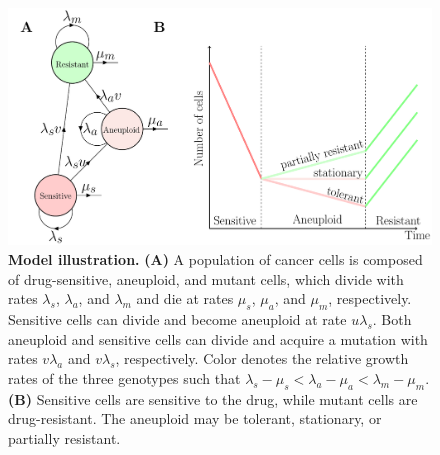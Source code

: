 \documentclass[12pt]{extarticle}
\begin{document}
\begin{figure}
\centering
\includegraphics[width=\textwidth]{Figures/figureAneuploidy.pdf}
\caption{
\textbf{Model illustration.}
\textbf{(A)} A population of cancer cells is composed of drug-sensitive, aneuploid, and mutant cells, which divide with rates $\lambda_s$, $\lambda_a$, and $\lambda_m$ and die at rates $\mu_s$, $\mu_a$, and $\mu_m$, respectively. 
Sensitive cells can divide and become aneuploid at rate $u\lambda_s$. Both aneuploid and sensitive cells can divide and acquire a mutation with rates $v\lambda_a$ and $v\lambda_s$, respectively. Color denotes the relative growth rates of the three genotypes such that $\lambda_s - \mu_s < \lambda_a - \mu_a < \lambda_m - \mu_m$. \textbf{(B)} Sensitive cells are sensitive to the drug, while mutant cells are drug-resistant. The aneuploid may be tolerant, stationary, or partially resistant.
}
\label{figureAneuploidy}
\end{figure}
\end{document}
